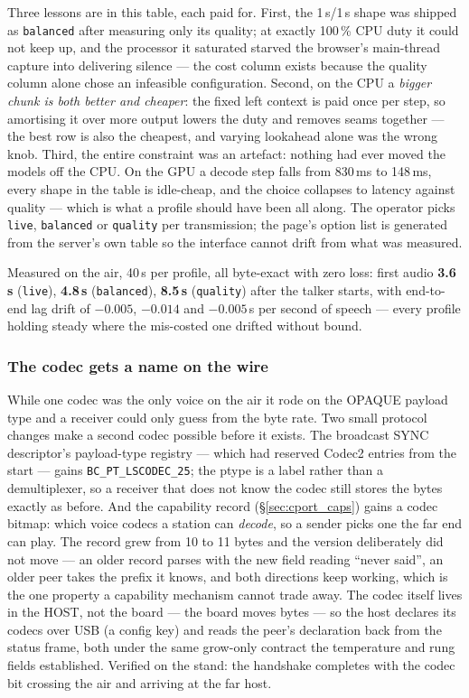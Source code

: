 Three lessons are in this table, each paid for.  First, the 1\,s/1\,s
shape was shipped as \texttt{balanced} after measuring only its
quality; at exactly 100\,\% CPU duty it could not keep up, and the
processor it saturated starved the browser's main-thread capture into
delivering silence --- the cost column exists because the quality
column alone chose an infeasible configuration.  Second, on the CPU a
\emph{bigger chunk is both better and cheaper}: the fixed left context
is paid once per step, so amortising it over more output lowers the
duty and removes seams together --- the best row is also the cheapest,
and varying lookahead alone was the wrong knob.  Third, the entire
constraint was an artefact: nothing had ever moved the models off the
CPU.  On the GPU a decode step falls from 830\,ms to 148\,ms, every
shape in the table is idle-cheap, and the choice collapses to latency
against quality --- which is what a profile should have been all
along.  The operator picks \texttt{live}, \texttt{balanced} or
\texttt{quality} per transmission; the page's option list is generated
from the server's own table so the interface cannot drift from what
was measured.

Measured on the air, 40\,s per profile, all byte-exact with zero loss:
first audio \textbf{3.6\,s} (\texttt{live}), \textbf{4.8\,s}
(\texttt{balanced}), \textbf{8.5\,s} (\texttt{quality}) after the
talker starts, with end-to-end lag drift of $-0.005$, $-0.014$ and
$-0.005$\,s per second of speech --- every profile holding steady where
the mis-costed one drifted without bound.

\subsubsection{The codec gets a name on the wire}
While one codec was the only voice on the air it rode on the OPAQUE
payload type and a receiver could only guess from the byte rate.  Two
small protocol changes make a second codec possible before it exists.
The broadcast SYNC descriptor's payload-type registry --- which had
reserved Codec2 entries from the start --- gains
\texttt{BC\_PT\_LSCODEC\_25}; the ptype is a label rather than a
demultiplexer, so a receiver that does not know the codec still stores
the bytes exactly as before.  And the capability record
(\S\ref{sec:cport_caps}) gains a codec bitmap: which voice codecs a
station can \emph{decode}, so a sender picks one the far end can play.
The record grew from 10 to 11 bytes and the version deliberately did
not move --- an older record parses with the new field reading
``never said'', an older peer takes the prefix it knows, and both
directions keep working, which is the one property a capability
mechanism cannot trade away.  The codec itself lives in the HOST, not
the board --- the board moves bytes --- so the host declares its
codecs over USB (a config key) and reads the peer's declaration back
from the status frame, both under the same grow-only contract the
temperature and rung fields established.  Verified on the stand: the
handshake completes with the codec bit crossing the air and arriving
at the far host.

